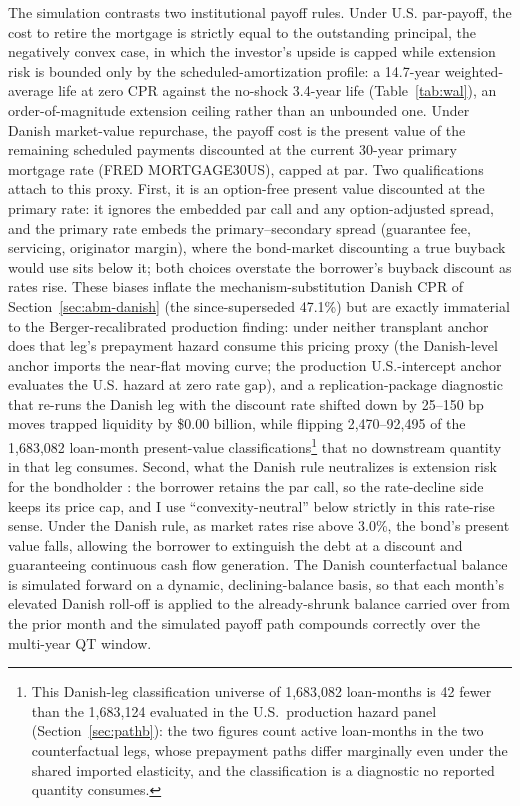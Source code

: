 \documentclass[12pt]{article}
\begin{document}
The simulation contrasts two institutional payoff rules. Under U.S. par-payoff, the cost to retire the mortgage is strictly equal to the outstanding principal, the negatively convex case, in which the investor's upside is capped while extension risk is bounded only by the scheduled-amortization profile: a 14.7-year weighted-average life at zero CPR against the no-shock 3.4-year life (Table~\ref{tab:wal}), an order-of-magnitude extension ceiling rather than an unbounded one. Under Danish market-value repurchase, the payoff cost is the present value of the remaining scheduled payments discounted at the current 30-year primary mortgage rate (FRED MORTGAGE30US), capped at par. Two qualifications attach to this proxy. First, it is an option-free present value discounted at the primary rate: it ignores the embedded par call and any option-adjusted spread, and the primary rate embeds the primary--secondary spread (guarantee fee, servicing, originator margin), where the bond-market discounting a true buyback would use sits below it; both choices overstate the borrower's buyback discount as rates rise. These biases inflate the mechanism-substitution Danish CPR of Section~\ref{sec:abm-danish} (the since-superseded 47.1\%) but are exactly immaterial to the Berger-recalibrated production finding: under neither transplant anchor does that leg's prepayment hazard consume this pricing proxy (the Danish-level anchor imports the near-flat moving curve; the production U.S.-intercept anchor evaluates the U.S. hazard at zero rate gap), and a replication-package diagnostic that re-runs the Danish leg with the discount rate shifted down by 25--150 bp moves trapped liquidity by \$0.00 billion, while flipping 2,470--92,495 of the 1,683,082 loan-month present-value classifications\footnote{This Danish-leg classification universe of 1{,}683{,}082 loan-months is 42 fewer than the 1{,}683{,}124 evaluated in the U.S.\ production hazard panel (Section~\ref{sec:pathb}): the two figures count active loan-months in the two counterfactual legs, whose prepayment paths differ marginally even under the shared imported elasticity, and the classification is a diagnostic no reported quantity consumes.} that no downstream quantity in that leg consumes. Second, what the Danish rule neutralizes is extension risk for the bondholder \citep{berger2026}: the borrower retains the par call, so the rate-decline side keeps its price cap, and I use ``convexity-neutral'' below strictly in this rate-rise sense. Under the Danish rule, as market rates rise above 3.0\%, the bond's present value falls, allowing the borrower to extinguish the debt at a discount and guaranteeing continuous cash flow generation. The Danish counterfactual balance is simulated forward on a dynamic, declining-balance basis, so that each month's elevated Danish roll-off is applied to the already-shrunk balance carried over from the prior month and the simulated payoff path compounds correctly over the multi-year QT window.
\end{document}

